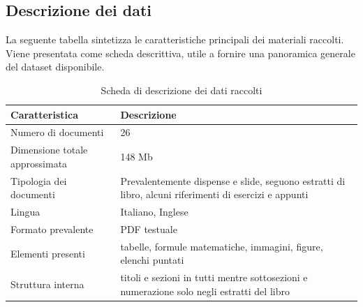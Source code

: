 \documentclass[a4paper,9pt]{article}
\begin{document}
\subsection{Descrizione dei dati}
La seguente tabella sintetizza le caratteristiche principali dei materiali raccolti. 
Viene presentata come scheda descrittiva, utile a fornire una panoramica generale del dataset disponibile.

\begin{table}[h!]
	\centering
	\renewcommand{\arraystretch}{1.3}
	\begin{tabular}{|p{5cm}|m{8cm}|}
		\hline
		\textbf{Caratteristica} & \textbf{Descrizione} \\
		\hline
		Numero di documenti & 26 \\ 
		\hline
		Dimensione totale approssimata & 148 Mb \\ 
		\hline
		Tipologia dei documenti & Prevalentemente dispense e slide, seguono estratti di libro, alcuni riferimenti di esercizi e appunti \\ 
		\hline
		Lingua & Italiano, Inglese \\ 
		\hline
		Formato prevalente & PDF testuale \\ 
		\hline
		Elementi presenti & tabelle, formule matematiche, immagini, figure, elenchi puntati \\ 
		\hline
		Struttura interna & titoli e sezioni in tutti mentre sottosezioni e numerazione solo negli estratti del libro \\
		\hline
	\end{tabular}
	\caption{Scheda di descrizione dei dati raccolti}
\end{table}
\end{document}
